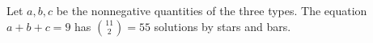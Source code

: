 Let $a,b,c$ be the nonnegative quantities of the three types. The equation $a+b+c=9$ has $\binom{11}{2}=\boxed{55}$ solutions by stars and bars.
